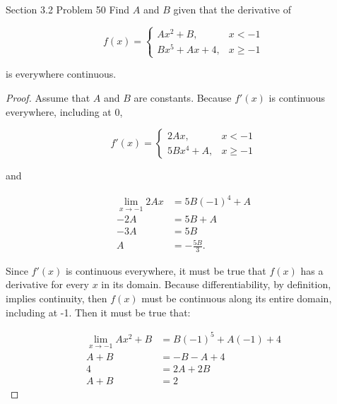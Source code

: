 \documentclass{article}
\begin{document}
    \pagebreak
    \thispagestyle{page4}


    \begin{tbhtheorem}{Section 3.2 Problem 50}
        Find $A$ and $B$ given that the derivative of

        \[
            f(x) =
            \begin{cases}
                Ax^2 + B,   & x < -1 \\
                Bx^5 + Ax + 4, & x \geq -1
            \end{cases}
        \]

        is everywhere continuous.
    \end{tbhtheorem}

    \begin{proof}
        Assume that $A$ and $B$ are constants. Because $f'(x)$ is continuous everywhere, including at 0,

        \[
            f'(x)   =
            \begin{cases}
                2Ax,        & x < -1 \\
                5Bx^4 + A,  & x \geq -1
            \end{cases}
        \]

        and

        \begin{align*}
            \lim_{x\to -1} 2Ax      &= 5B(-1)^4 + A \\
            -2A                     &= 5B + A \\
            -3A                     &= 5B \\
            A                       &= -\frac{5B}{3}.
        \end{align*}

        Since $f'(x)$ is continuous everywhere, it must be true that $f(x)$ has a derivative for every $x$ in its domain. Because differentiability, by definition, implies continuity, then $f(x)$ must be continuous along
        its entire domain, including at -1. Then it must be true that:

        \begin{align*}
            \lim_{x\to -1} Ax^2 + B &= B(-1)^5 + A(-1) + 4 \\
            A + B                   &= -B-A+4 \\
            4                       &= 2A + 2B \\
            A + B                   &= 2
        \end{align*}


\end{proof}
\end{document}
